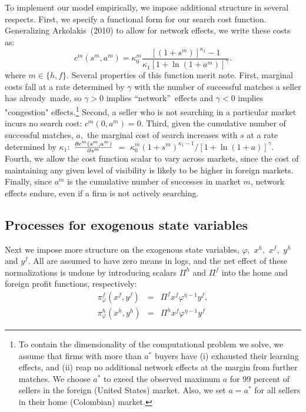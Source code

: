 \documentclass[12pt]{article}
\begin{document}
To implement our model empirically, we impose additional structure in
several respects. First, we specify a functional form for our search cost
function. Generalizing Arkolakis\ (2010) to allow for network effects, we
write these costs as:%
\begin{equation}
c^{m}(s^{m},a^{m})=\kappa _{0}^{m}\frac{\left[ (1+s^{m})\right] ^{\kappa
_{1}}-1}{\kappa _{1}\left[ 1+\ln (1+a^{m})\right] ^{\gamma }}.
\label{cost of effort}
\end{equation}%
where $m\in \{h,f\}.$ Several properties of this function merit note. First,
marginal costs fall at a rate determined by $\gamma $ with the number of
successful matches a seller has already\ made, so $\gamma >0$ implies
\textquotedblleft network\textquotedblright\ effects and $\gamma <0$ implies
"congestion" effects.\footnote{%
To contain the dimensionality of the computational problem we solve, we
assume that firms with more than $a^{\ast }$ buyers have (i) exhausted their
learning effects, and (ii) reap no additional network effects at the margin
from further matches. We choose $a^{\ast }$ to exeed the observed maximum $a$
for 99 percent of sellers in the foreign (United States) market. Also, we
set $a=a^{\ast }$ for all sellers in their home (Colombian) market.\medskip}
Second, a seller who is not searching in a particular market incurs no
search cost: $c^{m}(0,a^{m})=0.$ Third, given the cumulative number of
successful matches, $a,$ the marginal cost of search increases with $s$ at a
rate determined by $\kappa _{1}:$ $\frac{\partial c^{m}(s^{m},a^{m})}{%
\partial s^{m}}$ $=$ $\kappa _{0}^{m}(1+s^{m})^{\kappa _{1}-1}/\left[ 1+\ln
(1+a)\right] ^{\gamma }.$ Fourth, we allow the cost function scalar to vary
across markets, since the cost of maintaining any given level of visibility
is likely to be higher in foreign markets. Finally, since $a^{m}$ is the
cumulative number of successes in market $m$, network effects endure, even
if a firm is not actively searching.

\subsection{Processes for exogenous state variables}

Next we impose more structure on the exogenous state variables, $\varphi ,$ $%
x^{h},$ $x^{f},$ $y^{h}$ and $y^{f}.$ All are assumed to have zero means in
logs, and the net effect of these normalizations is undone by introducing
scalars $\Pi ^{h}$ and $\Pi ^{f}$ into the home and foreign profit
functions, respectively:%
\begin{eqnarray}
\pi _{\varphi }^{f}(x^{f},y^{f}) &=&\Pi ^{f}x^{f}\varphi ^{\eta -1}y^{f},
\label{profit3_f} \\
\pi _{\varphi }^{h}(x^{h},y^{h}) &=&\Pi ^{h}x^{f}\varphi ^{\eta -1}y^{f}
\label{profit3_h}
\end{eqnarray}
\end{document}
